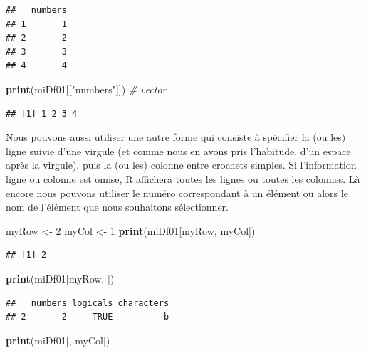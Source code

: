 \documentclass[
]{book}
\newenvironment{Shaded}{\begin{snugshade}}{\end{snugshade}}
\newcommand{\CommentTok}[1]{\textcolor[rgb]{0.56,0.35,0.01}{\textit{#1}}}
\newcommand{\DecValTok}[1]{\textcolor[rgb]{0.00,0.00,0.81}{#1}}
\newcommand{\KeywordTok}[1]{\textcolor[rgb]{0.13,0.29,0.53}{\textbf{#1}}}
\newcommand{\NormalTok}[1]{#1}
\newcommand{\StringTok}[1]{\textcolor[rgb]{0.31,0.60,0.02}{#1}}
\begin{document}
\begin{verbatim}
##   numbers
## 1       1
## 2       2
## 3       3
## 4       4
\end{verbatim}

\begin{Shaded}
\begin{Highlighting}[]
\KeywordTok{print}\NormalTok{(miDf01[[}\StringTok{"numbers"}\NormalTok{]]) }\CommentTok{# vector}
\end{Highlighting}
\end{Shaded}

\begin{verbatim}
## [1] 1 2 3 4
\end{verbatim}

Nous pouvons aussi utiliser une autre forme qui consiste à spécifier la (ou les) ligne suivie d'une virgule (et comme nous en avons pris l'habitude, d'un espace après la virgule), puis la (ou les) colonne entre crochets simples. Si l'information ligne ou colonne est omise, R affichera toutes les lignes ou toutes les colonnes. Là encore nous pouvons utiliser le numéro correspondant à un élément ou alors le nom de l'élément que nous souhaitons sélectionner.

\begin{Shaded}
\begin{Highlighting}[]
\NormalTok{myRow <-}\StringTok{ }\DecValTok{2}
\NormalTok{myCol <-}\StringTok{ }\DecValTok{1}
\KeywordTok{print}\NormalTok{(miDf01[myRow, myCol])}
\end{Highlighting}
\end{Shaded}

\begin{verbatim}
## [1] 2
\end{verbatim}

\begin{Shaded}
\begin{Highlighting}[]
\KeywordTok{print}\NormalTok{(miDf01[myRow, ])}
\end{Highlighting}
\end{Shaded}

\begin{verbatim}
##   numbers logicals characters
## 2       2     TRUE          b
\end{verbatim}

\begin{Shaded}
\begin{Highlighting}[]
\KeywordTok{print}\NormalTok{(miDf01[, myCol])}
\end{Highlighting}
\end{Shaded}
\end{document}
